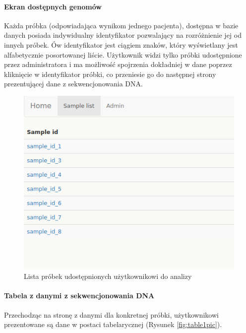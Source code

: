 \documentclass[a4paper,12pt,twoside]{article}
\begin{document}
\paragraph{Ekran dostępnych genomów}
Każda próbka (odpowiadająca wynikom jednego pacjenta), dostępna w bazie danych posiada indywidualny identyfikator pozwalający na
rozróżnienie jej od innych próbek. Ów identyfikator jest ciągiem znaków, który wyświetlany jest
alfabetycznie posortowanej liście. Użytkownik widzi tylko próbki udostępnione przez administratora
i ma możliwość spojrzenia dokładniej w dane poprzez kliknięcie w identyfikator próbki,
co przeniesie go do następnej strony prezentującej dane z sekwencjonowania DNA.

\begin{figure}[h!]
\includegraphics[width=\linewidth]{obrazy/aplikacja/sample_list.png}
\caption{Lista próbek udostępnionych użytkownikowi do analizy}
\label{fig:sample_listpic}
\end{figure}

\newpage
\paragraph{Tabela z danymi z sekwencjonowania DNA}
Przechodząc na stronę z danymi dla konkretnej próbki, użytkownikowi prezentowane są
dane w postaci tabelarycznej (Rysunek \ref{fig:table1pic}).
\end{document}
